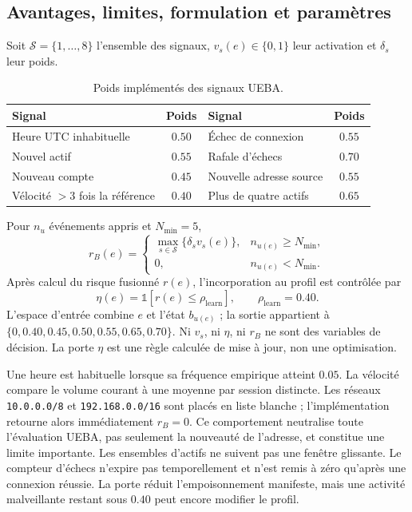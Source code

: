 \documentclass[11pt,a4paper,oneside]{report}
\theoremstyle{definition}
\theoremstyle{plain}
\begin{document}
\subsection*{Avantages, limites, formulation et paramètres}

Soit $\mathcal{S}=\{1,\ldots,8\}$ l'ensemble des signaux, $v_s(e)\in\{0,1\}$ leur activation et $\delta_s$ leur poids.
\begin{table}[H]
\centering
\caption{Poids implémentés des signaux UEBA.}
\label{tab:ai-ro-ueba-weights}
\small
\begin{tabular}{@{}lc@{\qquad}lc@{}}
\toprule
Signal & Poids & Signal & Poids\\
\midrule
Heure UTC inhabituelle & $0.50$ & Échec de connexion & $0.55$\\
Nouvel actif & $0.55$ & Rafale d'échecs & $0.70$\\
Nouveau compte & $0.45$ & Nouvelle adresse source & $0.55$\\
Vélocité $>3$ fois la référence & $0.40$ & Plus de quatre actifs & $0.65$\\
\bottomrule
\end{tabular}
\end{table}

Pour $n_u$ événements appris et $N_{\min}=5$,
\begin{equation}
r_B(e)=
\begin{cases}
\max_{s\in\mathcal{S}}\{\delta_sv_s(e)\},&n_{u(e)}\geq N_{\min},\\
0,&n_{u(e)}<N_{\min}.
\end{cases}
\label{eq:ai-ro-ueba}
\end{equation}
Après calcul du risque fusionné $r(e)$, l'incorporation au profil est contrôlée par
\begin{equation}
\eta(e)=\mathbb{1}[r(e)\leq\rho_{\mathrm{learn}}],
\qquad \rho_{\mathrm{learn}}=0.40.
\label{eq:ai-ro-learning-gate}
\end{equation}
L'espace d'entrée combine $e$ et l'état $b_{u(e)}$ ; la sortie appartient à
$\{0,0.40,0.45,0.50,0.55,0.65,0.70\}$. Ni $v_s$, ni $\eta$, ni $r_B$ ne sont des variables de décision. La porte $\eta$ est une règle calculée de mise à jour, non une optimisation.

Une heure est habituelle lorsque sa fréquence empirique atteint $0.05$. La vélocité compare le volume courant à une moyenne par session distincte. Les réseaux \texttt{10.0.0.0/8} et \texttt{192.168.0.0/16} sont placés en liste blanche ; l'implémentation retourne alors immédiatement $r_B=0$. Ce comportement neutralise toute l'évaluation UEBA, pas seulement la nouveauté de l'adresse, et constitue une limite importante. Les ensembles d'actifs ne suivent pas une fenêtre glissante. Le compteur d'échecs n'expire pas temporellement et n'est remis à zéro qu'après une connexion réussie. La porte réduit l'empoisonnement manifeste, mais une activité malveillante restant sous $0.40$ peut encore modifier le profil.
\end{document}
